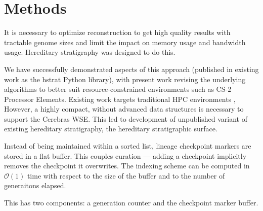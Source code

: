 \section{Methods} \label{sec:methods}

It is necessary to optimize reconstruction to get high quality results with tractable genome sizes and limit the impact on memory usage and bandwidth usage.
Hereditary stratigraphy \citep{moreno2022hereditary} was designed to do this.

We have successfully demonstrated aspects of this approach (published in existing work as the hstrat Python library), with present work revising the underlying algorithms to better suit resource-constrained environments such as CS-2 Processor Elements.
Existing work targets traditional HPC environments \citep{moreno2022hstrat},
However, a highly compact, without advanced data structures is necessary to support the Cerebras WSE.
This led to development of unpublished variant of existing hereditary stratigraphy, the hereditary stratigraphic surface.



Instead of being maintained within a sorted list, lineage checkpoint markers are stored in a flat buffer.
This couples curation --- adding a checkpoint implicitly removes the checkpoint it overwrites.
The indexing scheme can be computed in $\mathcal{O(1)}$ time with respect to the size of the buffer and to the number of generaitons elapsed.

This has two components: a generation counter and the checkpoint marker buffer.
